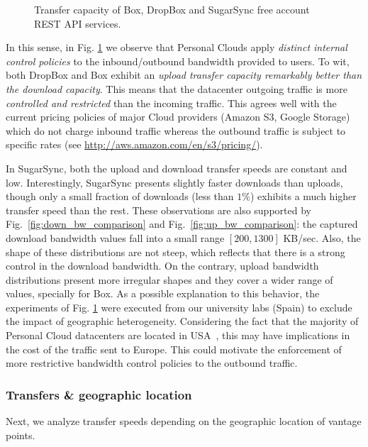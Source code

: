 \begin{figure}[t]
   \caption{Transfer capacity of Box, DropBox and SugarSync free account REST API services.}
   \label{fig:transfer_mean_speeds_and_bw_distributions}
   \vspace{-4mm}
\end{figure}

In this sense, in Fig. \ref{fig:transfer_mean_speeds_and_bw_distributions} we observe  
that Personal Clouds apply \textit{distinct internal control policies}
to the inbound/outbound bandwidth provided to users. To wit,
both DropBox and Box exhibit an \textit{upload transfer capacity remarkably better
than the download capacity}. This means that the datacenter outgoing
traffic is more \textit{controlled and restricted} than the incoming traffic. This agrees
well with the current pricing policies of major Cloud providers (Amazon S3,
Google Storage) which do not charge inbound traffic whereas
the outbound traffic is subject to specific rates (see \url{http://aws.amazon.com/en/s3/pricing/}). 

In SugarSync, both the upload and download transfer speeds are constant and
low. Interestingly, SugarSync presents slightly faster downloads than uploads,
though only a small fraction of downloads (less than $1\%$) exhibits a much
higher transfer speed than the rest. These observations are also supported by Fig.~\ref{fig:down_bw_comparison} and Fig.~\ref{fig:up_bw_comparison}: the captured download
bandwidth values fall into a small range $[200, 1300]$ KB/sec. Also,
the shape of these distributions are not steep, which reflects that there is
a strong control in the download bandwidth.
On the contrary, upload bandwidth distributions present more irregular shapes and
they cover a wider range of values, specially for Box.
As a possible explanation to this behavior, the experiments of Fig. \ref{fig:transfer_mean_speeds_and_bw_distributions} 
were executed from our university labs (Spain) to exclude the impact of geographic heterogeneity. 
Considering the fact that the majority of 
Personal Cloud datacenters are located in USA~\cite{drago2013benchmarking}, 
this may have implications in the cost of the traffic sent to Europe. This could motivate
the enforcement of more restrictive bandwidth control policies to
the outbound traffic.
\medskip

\subsubsection*{Transfers \& geographic location} 
Next, we analyze transfer speeds depending
on the geographic location of vantage points. 

